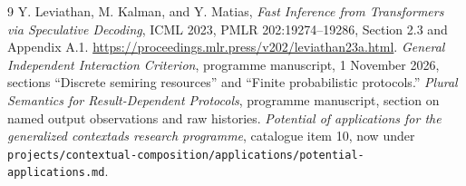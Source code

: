 \documentclass[11pt]{article}
\begin{document}
\begin{thebibliography}{9}
 Y. Leviathan, M. Kalman, and Y. Matias,
\emph{Fast Inference from Transformers via Speculative Decoding}, ICML 2023,
PMLR 202:19274--19286, Section 2.3 and Appendix A.1.
\url{https://proceedings.mlr.press/v202/leviathan23a.html}.
 \emph{General Independent Interaction Criterion}, programme
manuscript, 1 November 2026, sections ``Discrete semiring resources'' and
``Finite probabilistic protocols.''
 \emph{Plural Semantics for Result-Dependent Protocols}, programme
manuscript, section on named output observations and raw histories.
 \emph{Potential of applications for the generalized contextads
research programme}, catalogue item 10, now under
\texttt{projects/contextual-composition/applications/potential-applications.md}.
\end{thebibliography}
\end{document}
